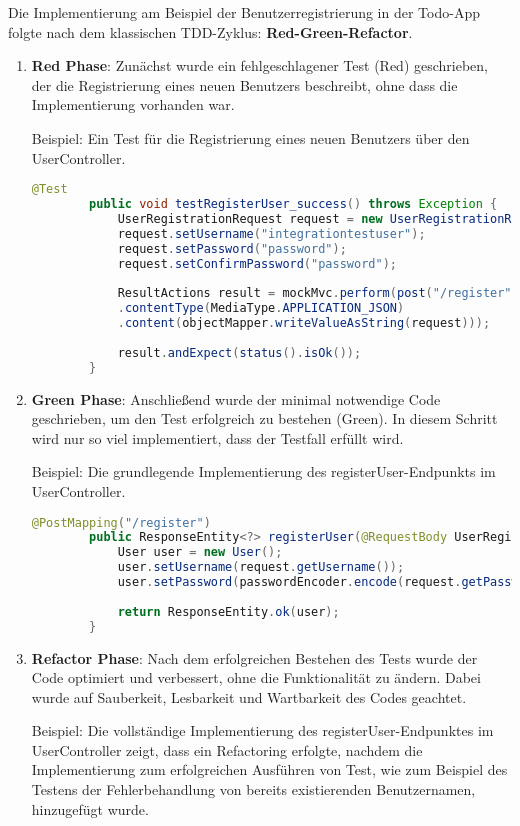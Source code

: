 Die Implementierung am Beispiel der Benutzerregistrierung in der Todo-App folgte nach dem klassischen TDD-Zyklus: \textbf{Red-Green-Refactor}.

\begin{enumerate}
	\item \textbf{Red Phase}: Zunächst wurde ein fehlgeschlagener Test (Red) geschrieben, der die Registrierung eines neuen Benutzers beschreibt, ohne dass die Implementierung vorhanden war.
	
	Beispiel: Ein Test für die Registrierung eines neuen Benutzers über den UserController.
	\begin{lstlisting}[language=Java]
		@Test
		public void testRegisterUser_success() throws Exception {
			UserRegistrationRequest request = new UserRegistrationRequest();
			request.setUsername("integrationtestuser");
			request.setPassword("password");
			request.setConfirmPassword("password");
			
			ResultActions result = mockMvc.perform(post("/register")
			.contentType(MediaType.APPLICATION_JSON)
			.content(objectMapper.writeValueAsString(request)));
			
			result.andExpect(status().isOk());
		}
	\end{lstlisting}
	
	\item \textbf{Green Phase}: Anschließend wurde der minimal notwendige Code geschrieben, um den Test erfolgreich zu bestehen (Green). In diesem Schritt wird nur so viel implementiert, dass der Testfall erfüllt wird.
	
	Beispiel: Die grundlegende Implementierung des registerUser-Endpunkts im UserController.
	
	\begin{lstlisting}[language=Java]
		@PostMapping("/register")
		public ResponseEntity<?> registerUser(@RequestBody UserRegistrationRequest request) {
			User user = new User();
			user.setUsername(request.getUsername());
			user.setPassword(passwordEncoder.encode(request.getPassword()));
			
			return ResponseEntity.ok(user);
		}
	\end{lstlisting}
	
	\item \textbf{Refactor Phase}: Nach dem erfolgreichen Bestehen des Tests wurde der Code optimiert und verbessert, ohne die Funktionalität zu ändern. Dabei wurde auf Sauberkeit, Lesbarkeit und Wartbarkeit des Codes geachtet.
	
	Beispiel: Die vollständige Implementierung des registerUser-Endpunktes im UserController zeigt, dass ein Refactoring erfolgte, nachdem die Implementierung zum erfolgreichen Ausführen von Test, wie zum Beispiel des Testens der Fehlerbehandlung von bereits existierenden Benutzernamen, hinzugefügt wurde.
	

\end{enumerate}
